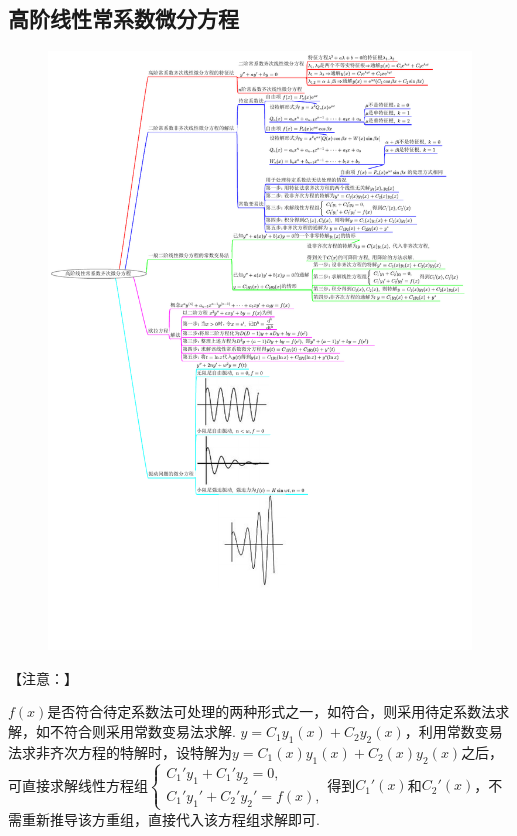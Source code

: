 \documentclass[12pt,UTF8]{ctexart}
\begin{document}
\subsection{高阶线性常系数微分方程}
\begin{figure}[H]
\begin{center}
\includegraphics[height=1\textheight]{Figures27/Structures-2.pdf}
\end{center}
\end{figure}
\noindent【注意：】
\begin{enumerate}
$f(x)$是否符合待定系数法可处理的两种形式之一，如符合，则采用待定系数法求解，如不符合则采用常数变易法求解.
$y=C_1y_1(x)+C_2y_2(x)$，利用常数变易法求非齐次方程的特解时，设特解为$y=C_1(x)y_1(x)+C_2(x)y_2(x)$之后，可直接求解线性方程组$\begin{cases}C_1'y_1+C_1'y_2=0,\\ C_1'y_1'+C_2'y_2'=f(x),\end{cases}$得到$C_1'(x)$和$C_2'(x)$，不需重新推导该方重组，直接代入该方程组求解即可.
\end{enumerate}
\end{document}
